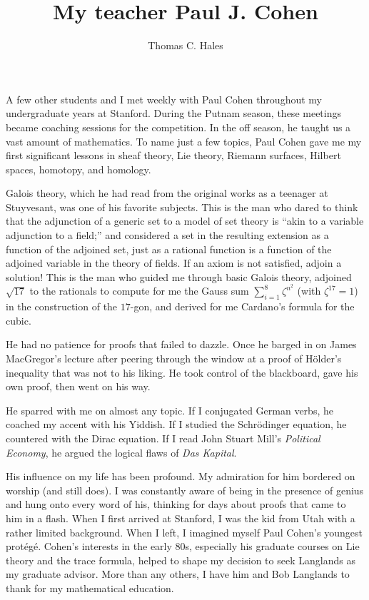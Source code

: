\documentclass{llncs}
\begin{document}
\title{My teacher Paul J. Cohen}
\author{Thomas C. Hales}
\maketitle


\section*{}

A few other
students and I met weekly with Paul Cohen throughout my undergraduate
years at Stanford.  
During the Putnam season, these meetings became coaching sessions
for the competition.  In the off season, he taught us a vast amount of
mathematics.
To name just a few topics, Paul Cohen gave me my first significant lessons in
sheaf theory, Lie theory, Riemann surfaces, Hilbert spaces, 
homotopy, and homology.


Galois theory, which he had read from the original works
as a teenager at Stuyvesant, was one of his favorite subjects.  This is the man who dared to think that the adjunction of a generic set to a model of set theory is ``akin to a variable adjunction to a field;'' and considered a set in the resulting extension
as a function of the adjoined set, just as a rational function is a function of
the adjoined variable in the theory of fields.  If an axiom is not satisfied, adjoin
a solution!
This is the man who guided me through basic Galois theory, adjoined $\sqrt{17}$ to the rationals to compute for me the Gauss sum
 $
 \sum_{i=1}^8 \zeta^{n^2}$  (with $\zeta^{17}=1$) in the construction of the $17$-gon, 
and derived for me Cardano's formula for the cubic.  


He had no patience for proofs that failed to dazzle.
Once he barged in on James MacGregor's lecture after peering through the window at a proof of H\"older's inequality that was not to his liking.  He took control of the blackboard,  gave his own proof, then went on his way.


He sparred with me on almost any topic.  If I conjugated German verbs, he coached my accent with his Yiddish.  If I studied the Schr\"odinger equation, he countered with the Dirac equation.  If I read John Stuart Mill's {\it Political Economy}, he argued the logical flaws of {\it Das Kapital}.



His influence on my life has been profound.
My admiration for him bordered on worship (and still does).
I was constantly aware of being in the presence of genius and hung onto every word of his,
thinking for days about proofs that came to him in a flash.
When I first arrived at Stanford, I was the
kid from Utah with a rather limited background.  When I left,  I imagined myself Paul Cohen's
youngest prot\'eg\'e.  Cohen's interests in the early 80s, especially his graduate courses on Lie theory and the trace formula, helped to shape
my decision to seek  Langlands as my graduate advisor.
More than any others, I have him and Bob Langlands to thank for my mathematical education.
\end{document}
